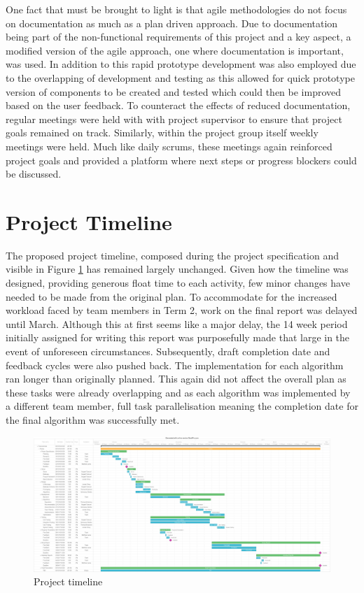 One fact that must be brought to light is that agile methodologies do not focus on documentation as much as a plan driven approach. Due to documentation being part of the non-functional requirements of this project and a key aspect, a modified version of the agile approach, one where documentation is important, was used. In addition to this rapid prototype development was also employed due to the overlapping of development and testing as this allowed for quick prototype version of components to be created and tested which could then be improved based on the user feedback. To counteract the effects of reduced documentation, regular meetings were held with with project supervisor to ensure that project goals remained on track. Similarly, within the project group itself weekly meetings were held. Much like daily scrums, these meetings again reinforced project goals and provided a platform where next steps or progress blockers could be discussed.

\section{Project Timeline}
The proposed project timeline, composed during the project specification and visible in Figure \ref{fig:timeline} has remained largely unchanged. Given how the timeline was designed, providing generous float time to each activity, few minor changes have needed to be made from the original plan. To accommodate for the increased workload faced by team members in Term 2, work on the final report was delayed until March. Although this at first seems like a major delay, the 14 week period initially assigned for writing this report was purposefully made that large in the event of unforeseen circumstances. Subsequently, draft completion date and feedback cycles were also pushed back. The implementation for each algorithm ran longer than originally planned. This again did not affect the overall plan as these tasks were already overlapping and as each algorithm was implemented by a different team member, full task parallelisation meaning the completion date for the final algorithm was successfully met.

\begin{figure}[H]
  \centering
  \includegraphics[width=1.0\textwidth]{Images/ProjectManagement/timeline}
  \caption{Project timeline} 
  \label{fig:timeline} 
\end{figure}

